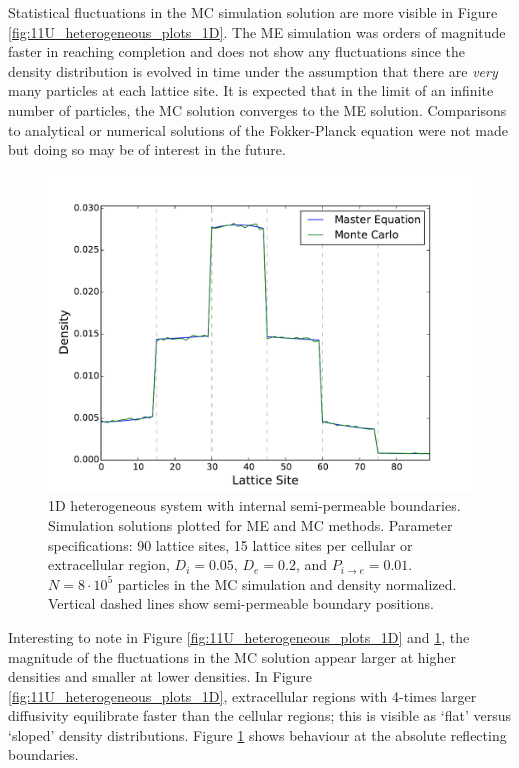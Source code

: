 	Statistical fluctuations in the MC simulation solution are more visible in Figure \ref{fig:11U_heterogeneous_plots_1D}. The ME simulation was orders of magnitude faster in reaching completion and does not show any fluctuations since the density distribution is evolved in time under the assumption that there are \textsl{very} many particles at each lattice site. It is expected that in the limit of an infinite number of particles, the MC solution converges to the ME solution. Comparisons to analytical or numerical solutions of the Fokker-Planck equation were not made but doing so may be of interest in the future.
	
	\begin{figure}[h]
		\centering
		\includegraphics[width=1.0\linewidth]{../images/1D/3U_heterogeneous_plots_1D}
		\caption{1D heterogeneous system with internal semi-permeable boundaries. Simulation solutions plotted for ME and MC methods. Parameter specifications: 90 lattice sites, 15 lattice sites per cellular or extracellular region, $ D_i = 0.05 $, $ D_e = 0.2 $, and $ P_{i\rightarrow e} = 0.01 $. $ N = 8 \cdot 10^5 $ particles in the MC simulation and density normalized. Vertical dashed lines show semi-permeable boundary positions.}
		\label{fig:3U_heterogeneous_plots_1D}
	\end{figure}
	
	\newpage
	Interesting to note in Figure \ref{fig:11U_heterogeneous_plots_1D} and \ref{fig:3U_heterogeneous_plots_1D}, the magnitude of the fluctuations in the MC solution appear larger at higher densities and smaller at lower densities. In Figure \ref{fig:11U_heterogeneous_plots_1D}, extracellular regions with 4-times larger diffusivity equilibrate faster than the cellular regions; this is visible as `flat' versus `sloped' density distributions. Figure \ref{fig:3U_heterogeneous_plots_1D} shows behaviour at the absolute reflecting boundaries.
	
